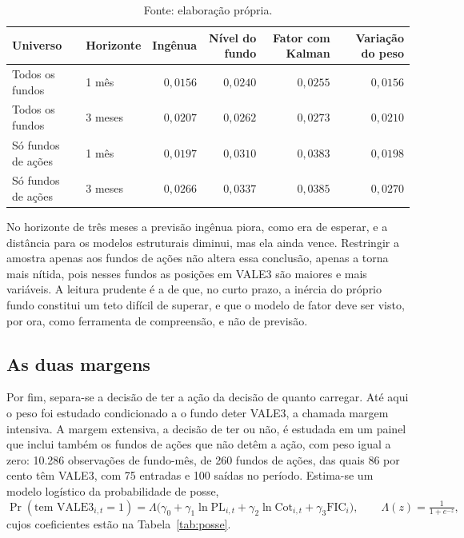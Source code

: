 \documentclass[12pt,a4paper]{article}
\begin{document}
\begin{table}[h]\centering\small
\caption{Erro de previsão fora da amostra, medido pela raiz do erro quadrático médio, nos
horizontes de um e de três meses.}
\label{tab:fc}
\begin{tabular}{@{}llrrrr@{}}
\toprule
Universo & Horizonte & Ingênua & Nível do fundo & Fator com Kalman & Variação do peso \\
\midrule
Todos os fundos      & 1 mês  & $0{,}0156$ & $0{,}0240$ & $0{,}0255$ & $0{,}0156$ \\
Todos os fundos      & 3 meses& $0{,}0207$ & $0{,}0262$ & $0{,}0273$ & $0{,}0210$ \\
Só fundos de ações   & 1 mês  & $0{,}0197$ & $0{,}0310$ & $0{,}0383$ & $0{,}0198$ \\
Só fundos de ações   & 3 meses& $0{,}0266$ & $0{,}0337$ & $0{,}0385$ & $0{,}0270$ \\
\bottomrule
\end{tabular}
\caption*{\footnotesize Fonte: elaboração própria.}
\end{table}

No horizonte de três meses a previsão ingênua piora, como era de esperar, e a distância para
os modelos estruturais diminui, mas ela ainda vence. Restringir a amostra apenas aos fundos
de ações não altera essa conclusão, apenas a torna mais nítida, pois nesses fundos as
posições em VALE3 são maiores e mais variáveis. A leitura prudente é a de que, no curto prazo,
a inércia do próprio fundo constitui um teto difícil de superar, e que o modelo de fator deve
ser visto, por ora, como ferramenta de compreensão, e não de previsão.

\subsection{As duas margens}

Por fim, separa-se a decisão de ter a ação da decisão de quanto carregar. Até aqui o peso foi
estudado condicionado a o fundo deter VALE3, a chamada margem intensiva. A margem extensiva, a
decisão de ter ou não, é estudada em um painel que inclui também os fundos de ações que não detêm a
ação, com peso igual a zero: 10.286 observações de fundo-mês, de 260 fundos de ações, das quais 86
por cento têm VALE3, com 75 entradas e 100 saídas no período. Estima-se um modelo logístico da
probabilidade de posse,
\begin{equation}
\Pr(\text{tem VALE3}_{i,t}=1) = \Lambda\!\big(\gamma_0 + \gamma_1\ln\text{PL}_{i,t}
      + \gamma_2\ln\text{Cot}_{i,t} + \gamma_3\text{FIC}_i\big),
\qquad \Lambda(z)=\tfrac{1}{1+e^{-z}},
\label{eq:posse}
\end{equation}
cujos coeficientes estão na Tabela~\ref{tab:posse}.
\end{document}

